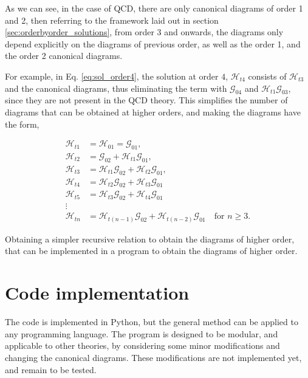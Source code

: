 \documentclass[11pt,a4paper,twoside,pdf]{article}
\numberwithin{equation}{section}
\begin{document}
As we can see, in the case of QCD, there are only canonical diagrams of order 1 and 2, 
then referring to the framework laid out in section \ref{sec:orderbyorder_solutions}, 
from order 3  and onwards, the diagrams only depend explicitly on the diagrams of 
previous order, as well as the order 1, and the order 2 canonical diagrams.

For example, in Eq. \eqref{eq:sol_order4}, the solution at order $4$, $\mathcal{H}_{t4}$ consists of 
$\mathcal{H}_{t 3}$ and the canonical diagrams, thus eliminating the term with $\mathcal{G}_{04}$ and
$\mathcal{H}_{t1}\mathcal{G}_{03}$, since they are not present in the QCD theory.
This simplifies the number of diagrams that can be obtained at higher orders,
and making the diagrams have the form,

\begin{align}
    \mathcal{H}_{t1} & = \mathcal{H}_{01} = \mathcal{G}_{01}, \\
    \mathcal{H}_{t2} & = \mathcal{G}_{02} + \mathcal{H}_{t1} \mathcal{G}_{01}, \\
    \mathcal{H}_{t3} & =  \mathcal{H}_{t1} \mathcal{G}_{02} + 
    \mathcal{H}_{t2} \mathcal{G}_{01}, \\
    \mathcal{H}_{t4} & =  \mathcal{H}_{t2} \mathcal{G}_{02} + \mathcal{H}_{t3} \mathcal{G}_{01}\\
    \mathcal{H}_{t5} & =  \mathcal{H}_{t3} \mathcal{G}_{02} + \mathcal{H}_{t4} \mathcal{G}_{01} \\
    \vdots & \nonumber\\
    \mathcal{H}_{tn} &=  \mathcal{H}_{t(n-1)} \mathcal{G}_{02} +
    \mathcal{H}_{t(n-2)} \mathcal{G}_{01} \quad \text{for } n \geq 3.
\end{align}

Obtaining a simpler recursive relation to obtain the diagrams of higher order,
that can be implemented in a program to obtain the diagrams of higher order.

\newpage

\section{Code implementation} \label{sec:code}

The code is implemented in Python, but the general method can be applied to any 
programming language. The program is designed to be modular, and applicable to
other theories, by considering some minor modifications and changing the canonical
diagrams. These modifications are not implemented yet, and remain to be tested.
\end{document}
